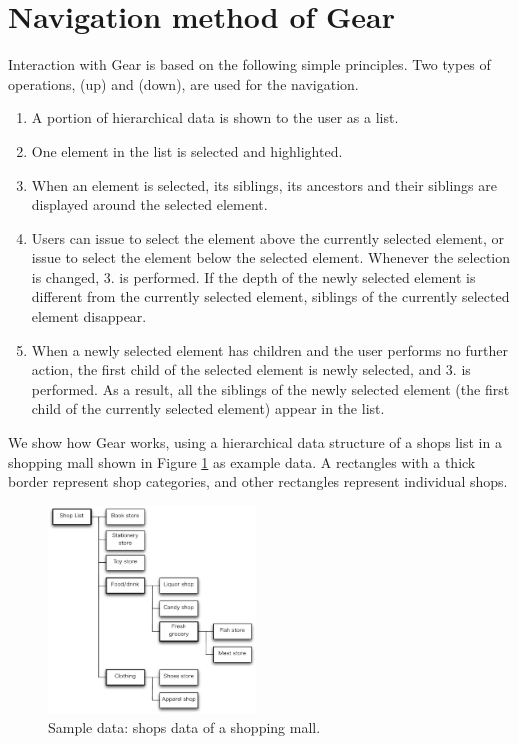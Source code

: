 \documentclass[conference]{IEEEtran}
\def\up{\tsf{▲}}
\def\down{\tsf{▼}}
\begin{document}
\section{Navigation method of Gear}
\label{navigation}

Interaction with Gear is based on the following simple principles.
Two types of operations,
{\up} (up) and {\down} (down), are used for the navigation.

\begin{enumerate}
\item A portion of hierarchical data is shown to the user as a list.

\item One element in the list is selected and highlighted.


\item When an element is selected, its siblings, its ancestors and their siblings are displayed
around the selected element.

\item Users can issue {\up} to select the element above the currently selected element,
or issue {\down} to select the element below the selected element.
Whenever the selection is changed, 3. is performed.
If the depth of the newly selected element is different from the currently
selected element, siblings of the currently selected element disappear.

\item When a newly selected element has children and the user performs no further action,
the first child of the selected element is newly selected, and 3. is performed.
As a result, all the siblings of the newly selected element
(the first child of the currently selected element) appear in the list.

\end{enumerate}

We show how Gear works, using a hierarchical data structure of
a shops list in a shopping mall shown in Figure \ref{fig1} as example data.
A rectangles with a thick border represent shop categories, and
other rectangles represent individual shops.

\begin{figure}[H]
  \centerline{\includegraphics[width=55mm,bb=0 0 490 490]{figures/fig1.pdf}}
  \caption{Sample data: shops data of a shopping mall.}
  \label{fig1}
\end{figure}
\end{document}
